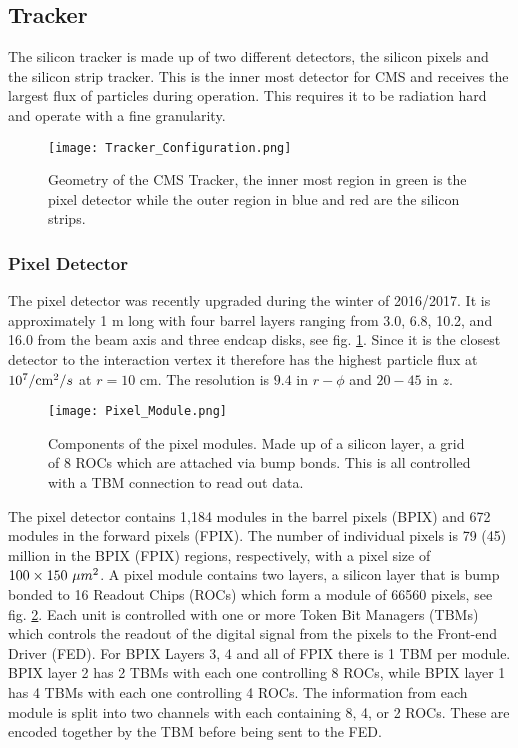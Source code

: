 \subsection{Tracker}
\label{sec:Tracker}

The silicon tracker is made up of two different detectors, the silicon pixels and the silicon strip tracker. This is the inner most detector for CMS and receives the largest flux of particles during operation. This requires it to be radiation hard and operate with a fine granularity. 

\begin{figure}
 	\centering
	\texttt{[image: Tracker\_Configuration.png]}
 	\caption{Geometry of the CMS Tracker, the inner most region in green is the pixel detector while the outer region in blue and red are the silicon strips.}
 	\label{CMSTracker} 
\end{figure}

\subsubsection{Pixel Detector}
\label{subsec:Pixel}

The pixel detector was recently upgraded during the winter of 2016/2017. It is approximately 1 m long with four barrel layers ranging from 3.0, 6.8, 10.2, and 16.0 \cm{} from the beam axis and three endcap disks, see fig. \ref{CMSTracker}. Since it is the closest detector to the interaction vertex it therefore has the highest particle flux at $10^7/\text{cm}^2/s$ at $r=10$ cm. The resolution is $9.4$ \mum{} in $r-\phi$ and $20-45$ \mum{} in $z$.

\begin{figure}
 	\centering
	\texttt{[image: Pixel\_Module.png]}
 	\caption{Components of the pixel modules. Made up of a silicon layer, a grid of 8 ROCs which are attached via bump bonds. This is all controlled with a TBM connection to read out data.}
 	\label{PixelModule} 
\end{figure}

The pixel detector contains 1,184 modules in the barrel pixels (BPIX) and 672 modules in the forward pixels (FPIX). The number of individual pixels is 79 (45) million in the BPIX (FPIX) regions, respectively, with a pixel size of $100\times150 \text{ }\text{}\mu m^2$. A pixel module contains two layers, a silicon layer that is bump bonded to 16 Readout Chips (ROCs) which form a module of 66560 pixels, see fig. \ref{PixelModule}. Each unit is controlled with one or more Token Bit Managers (TBMs) which controls the readout of the digital signal from the pixels to the Front-end Driver (FED). For BPIX Layers 3, 4 and all of FPIX there is 1 TBM per module. BPIX layer 2 has 2 TBMs with each one controlling 8 ROCs, while BPIX layer 1 has 4 TBMs with each one controlling 4 ROCs. The information from each module is split into two channels with each containing 8, 4, or 2 ROCs. These are encoded together by the TBM before being sent to the FED.

